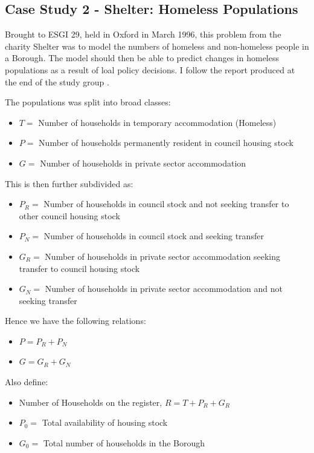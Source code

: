 \documentclass[11pt]{article} %
\begin{document}
	
	
	\subsection{Case Study 2 - Shelter: Homeless Populations \label{homeless}}
	

   Brought to ESGI 29, held in Oxford in March 1996, this problem from the charity Shelter  was to model the numbers of homeless and non-homeless people in a Borough. The model should then be able to predict changes in homeless populations as a result of loal policy decisions. I follow the report produced at the end of the study group \cite{Shelter1996}.
	
	The populations was split into broad classes: 
	\begin{itemize}
		\item $ T= $ Number of households in temporary accommodation (Homeless)
		\item $  P= $ Number of households permanently resident in council housing stock
		\item $ G= $ Number of households in private sector accommodation 
	\end{itemize}
	This is then further subdivided as:
	\begin{itemize}
		\item $ P_R= $ Number of households in council stock and not  seeking transfer to other council housing stock 
		\item $ P_N= $ Number of households in council stock and seeking transfer 
		\item $ G_R= $ Number of households in private sector accommodation seeking transfer to council housing stock 
		\item $ G_N= $ Number of households in private sector accommodation and not seeking transfer
	\end{itemize}

Hence we have the following relations:
\begin{itemize}
	\item $ P=P_R+P_N $
	\item $ G=G_R+G_N $
	
\end{itemize}

Also define: 
\begin{itemize}
	\item Number of Households on the register,  $  R=T+P_R+G_R $
	\item $ P_0 = $ Total availability of housing stock 
	\item $ G_0= $ Total number of households in the Borough
\end{itemize}
\end{document}
